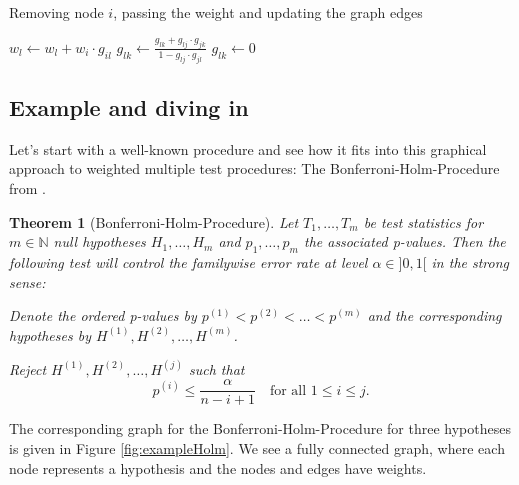 \documentclass[a4paper, 10pt]{article}\usepackage[]{graphicx}\usepackage[]{color}
\numberwithin{equation}{section}
\theoremstyle{definition}
\theoremstyle{plain}
\newtheorem{Theorem}[Def]{Theorem}
\newcommand{\N}{\ensuremath{\mathbb{N}}\xspace}
\begin{document}
\begin{algorithm}
\caption{Removing node $i$, passing the weight and updating the graph edges}
\label{alg:rmNodeAlg}
\begin{algorithmic}
  \STATE $w_l \gets w_l+w_i\cdot g_{il}$
      \STATE $g_{lk} \gets \frac{g_{lk}+g_{lj}\cdot g_{jk}}{1-g_{lj}\cdot g_{jl}}$
    \ELSE
      \STATE $g_{lk} \gets 0$
    \ENDIF    
  \ENDFOR
\ENDFOR
\end{algorithmic}
\end{algorithm}

\subsection{Example and diving in}

Let's start with a well-known procedure and see how it fits into this
graphical approach to weighted multiple test procedures: The
Bonferroni-Holm-Procedure from \cite{Holm79}.

\begin{Theorem}[Bonferroni-Holm-Procedure] 
Let $T_1, \ldots, T_m$
be test statistics for $m\in\N$ null hypotheses $H_1, \ldots, H_m$ and
$p_1, \ldots, p_m$ the associated p-values. Then the following test
will control the familywise error rate at level $\alpha\in]0,1[$ in
    the strong sense:

Denote the ordered p-values by $p^{(1)}<p^{(2)}<\ldots<p^{(m)}$ 
and the corresponding hypotheses by $H^{(1)},H^{(2)},\ldots, H^{(m)}$.

Reject $H^{(1)},H^{(2)},\ldots, H^{(j)}$ such that 
\[p^{(i)}\leq\frac{\alpha}{n-i+1}\quad\text{for all $1\leq i\leq j$}.\]
\end{Theorem}

The corresponding graph for the Bonferroni-Holm-Procedure for three
hypotheses is given in Figure \ref{fig:exampleHolm}.  We see a fully
connected graph, where each node represents a hypothesis and the nodes
and edges have weights.
\end{document}

